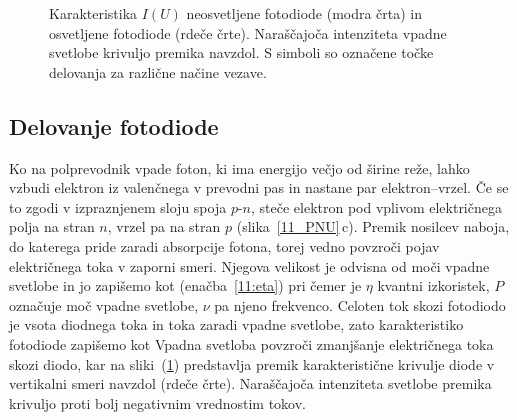 \begin{figure}[h]
\centering
\def\svgwidth{100truemm} 

\caption{Karakteristika $I(U)$  neosvetljene fotodiode (modra črta)
in osvetljene fotodiode (rdeče črte). Naraščajoča intenziteta vpadne svetlobe
krivuljo premika navzdol. S simboli so označene točke delovanja za različne načine vezave.}
\label{11_IU}
\end{figure}
 

 
\subsection*{Delovanje fotodiode}
Ko na polprevodnik vpade foton, ki ima energijo večjo od širine reže, 
lahko vzbudi elektron iz valenčnega v prevodni pas in nastane par elektron--vrzel. 
Če se to zgodi v izpraznjenem sloju spoja $p$-$n$, steče elektron pod vplivom 
električnega polja na stran $n$, vrzel pa na stran $p$ (slika~\ref{11_PNU}\,c). 
Premik nosilcev naboja, do katerega pride zaradi absorpcije fotona, torej vedno
povzroči pojav električnega toka v zaporni smeri. 
Njegova velikost je odvisna od moči vpadne svetlobe in jo zapišemo kot 
(enačba~\ref{11:eta})
pri čemer je $\eta$ kvantni izkoristek, $P$ označuje moč vpadne svetlobe, $\nu$ pa njeno
frekvenco. Celoten tok skozi fotodiodo je vsota diodnega toka
in toka zaradi vpadne svetlobe, zato karakteristiko fotodiode zapišemo kot 
Vpadna svetloba povzroči zmanjšanje električnega toka skozi diodo, 
kar na sliki~(\ref{11_IU}) predstavlja premik karakteristične krivulje diode v vertikalni 
smeri navzdol (rdeče črte). Naraščajoča intenziteta svetlobe premika krivuljo proti 
bolj negativnim vrednostim tokov. 

